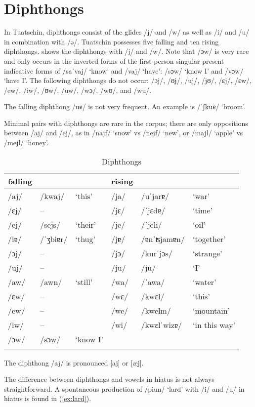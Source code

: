 \section{Diphthongs}
In Tuatschin, diphthongs consist of the glides /j/ and /w/ as well as /i/ and /u/ in combination with /ə/. Tuatschin possesses five falling and ten rising diphthongs.  shows the diphthongs with /j/ and /w/. Note that /ɔw/ is very rare and only occurs in the inverted forms of the first person singular present indicative forms of /saˈvaj/ `know' and /vaj/ `have': /sɔw/ `know I' and /vɔw/ `have I'. The following diphthongs do not occur: /ɔj/, /ʊj/, /uj/, /jʊ/, /ɛj/, /ɛw/, /ew/, /iw/, /ʊw/, /uw/, /wɔ/, /wʊ/, and /wu/.

The falling diphthong /uɐ/ is not very frequent. An example is  /ˈʃkuɐ/ `broom'.

Minimal pairs with diphthongs are rare in the corpus; there are only oppositions between /aj/ and /ej/, as in /najf/ `snow' vs /nejf/ `new', or /majl/ `apple' vs /mejl/ `honey'.

\begin{table}
\caption{Diphthongs}
	\label{diph}
	\begin{tabular}{llllll}
		\lsptoprule
		falling & & & rising & & \\
		\midrule
		/aj/ & /kwaj/ & `this' & /ja/ & /uˈjarɐ/ & `war'\\
		/ɛj/ & -- & & /jɛ/ & /ˈjɛdɐ/ & `time'\\
		/ej/ & /sejs/ & `their' & /je/ & /ˈjeli/ & `oil'\\
		/iɐ/ & /ˈʒbiɐr/ & `thug' & /jɐ/ & /ɐnˈʦjamɐn/ & `together'\\
		/ɔj/ & -- & & /jɔ/ & /kurˈjɔs/ & `strange'\\
		/uj/ & -- & & /ju/ & /ju/ & `I'\\
		/aw/ & /awn/ & `still' & /wa/ & /ˈawa/ & `water'\\
		/ɛw/ & -- & & /wɛ/ & /kwɛl/ & `this'\\
		/ew/ &  -- & & /we/ & /kwelm/ & `mountain'\\
		/iw/ & -- & & /wi/ & /kwɛlˈwizɐ/ & `in this way'\\
		/ɔw/ & /sɔw/ & `know I' \\
		\lspbottomrule
	\end{tabular}
\end{table}

The diphthong /aj/ is pronounced [aj] or [æj].

The difference between diphthongs and vowels in hiatus is not always straightforward. A spontaneous production of /piun/ `lard' with /i/ and /u/ in hiatus is found in (\ref{ex:lard}).


